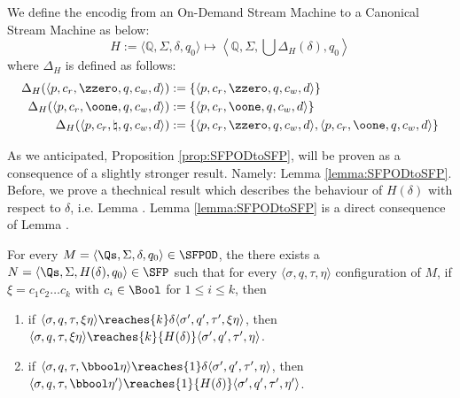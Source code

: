 \begin{defn}
  \label{def:SFPODtoSFPmap}
  We define the encodig from an On-Demand Stream Machine to a Canonical Stream Machine
  as below:
  $$
    H := \langle \mathbb Q, \Sigma, \delta, q_0\rangle \mapsto \left\langle \mathbb Q, \Sigma, \bigcup\Delta_H(\delta), q_0\right\rangle
  $$
  where $\Delta_H$ is defined as follows:
  \begin{align*}
    \Delta_H(\langle p, c_r, \zzero, q, c_w, d\rangle) &:= \{\langle p, c_r, \zzero, q, c_w, d\rangle\}\\
    \Delta_H(\langle p, c_r, \oone, q, c_w, d\rangle) &:= \{\langle p, c_r, \oone, q, c_w, d\rangle\}\\
    \Delta_H(\langle p, c_r, \natural, q, c_w, d\rangle) &:= \{\langle p, c_r, \zzero, q, c_w, d\rangle, \langle p, c_r, \oone, q, c_w, d\rangle\}\\
  \end{align*}
\end{defn}


As we anticipated, Proposition \ref{prop:SFPODtoSFP}, will be proven as a consequence of
a slightly stronger result. Namely: Lemma \ref{lemma:SFPODtoSFP}. Before, we prove a
thechnical result which describes the behaviour of $H(\delta)$ with respect to $\delta$,
i.e. Lemma \label{lemma:SFPODtoSFPtech}.
Lemma \ref{lemma:SFPODtoSFP} is a direct consequence of Lemma \label{lemma:SFPODtoSFPtech}.

\begin{lemma}
  \label{lemma:SFPODtoSFPtech}
  For every $M = \langle \Qs, \Sigma, \delta, q_0\rangle
  \in \SFPOD$, the there exists a $N = \langle \Qs, \Sigma, H(\delta), q_0\rangle
  \in\SFP$ such that
  for every $\langle \sigma, q, \tau, \eta\rangle$ configuration of $M$, if
  $\xi =c_1c_2\ldots c_k$ with $c_i \in \Bool$ for $1 \le i \le k$, then
  \begin{enumerate}
    \item if $\langle \sigma, q, \tau, \xi\eta\rangle \reaches {k} \delta \langle \sigma', q', \tau', \xi\eta\rangle$, then
    $\langle \sigma, q, \tau, \xi\eta\rangle \reaches {k} {H(\delta)} \langle \sigma', q', \tau', \eta\rangle$.
    \item if $\langle \sigma, q, \tau, \bbool\eta\rangle \reaches {1} \delta \langle \sigma', q', \tau', \eta\rangle$, then
    $\langle \sigma, q, \tau, \bbool\eta'\rangle \reaches {1} {H(\delta)} \langle \sigma', q', \tau', \eta'\rangle$.
  \end{enumerate}
\end{lemma}

